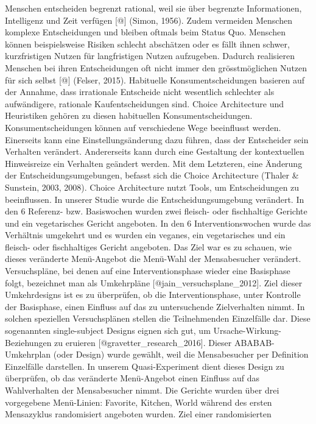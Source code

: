 \documentclass[12pt,ngerman,]{article}
\begin{document}
Menschen entscheiden begrenzt rational, weil sie über begrenzte
Informationen, Intelligenz und Zeit verfügen {[}@{]} (Simon, 1956).
Zudem vermeiden Menschen komplexe Entscheidungen und bleiben oftmals
beim Status Quo. Menschen können beispielsweise Risiken schlecht
abschätzen oder es fällt ihnen schwer, kurzfristigen Nutzen für
langfristigen Nutzen aufzugeben. Dadurch realisieren Menschen bei ihren
Entscheidungen oft nicht immer den grösstmöglichen Nutzen für sich
selbst {[}@{]} (Felser, 2015). Habituelle Konsumentscheidungen basieren
auf der Annahme, dass irrationale Entscheide nicht wesentlich schlechter
als aufwändigere, rationale Kaufentscheidungen sind. Choice Architecture
und Heuristiken gehören zu diesen habituellen Konsumentscheidungen.
Konsumentscheidungen können auf verschiedene Wege beeinflusst werden.
Einerseits kann eine Einstellungsänderung dazu führen, dass der
Entscheider sein Verhalten verändert. Andererseits kann durch eine
Gestaltung der kontextuellen Hinweisreize ein Verhalten geändert werden.
Mit dem Letzteren, eine Änderung der Entscheidungsumgebungen, befasst
sich die Choice Architecture (Thaler \& Sunstein, 2003, 2008). Choice
Architecture nutzt Tools, um Entscheidungen zu beeinflussen. In unserer
Studie wurde die Entscheidungsumgebung verändert. In den 6 Referenz-
bzw. Basiswochen wurden zwei fleisch- oder fischhaltige Gerichte und ein
vegetarisches Gericht angeboten. In den 6 Interventionswochen wurde das
Verhältnis umgekehrt und es wurden ein veganes, ein vegetarisches und
ein fleisch- oder fischhaltiges Gericht angeboten. Das Ziel war es zu
schauen, wie dieses veränderte Menü-Angebot die Menü-Wahl der
Mensabesucher verändert. Versuchspläne, bei denen auf eine
Interventionsphase wieder eine Basisphase folgt, bezeichnet man als
Umkehrpläne {[}@jain\_versuchsplane\_2012{]}. Ziel dieser Umkehrdesigns
ist es zu überprüfen, ob die Interventionsphase, unter Kontrolle der
Basisphase, einen Einfluss auf das zu untersuchende Zielverhalten nimmt.
In solchen speziellen Versuchsplänen stellen die Teilnehmenden
Einzelfälle dar. Diese sogenannten single-subject Designs eignen sich
gut, um Ursache-Wirkung-Beziehungen zu eruieren
{[}@gravetter\_research\_2016{]}. Dieser ABABAB-Umkehrplan (oder Design)
wurde gewählt, weil die Mensabesucher per Definition Einzelfälle
darstellen. In unserem Quasi-Experiment dient dieses Design zu
überprüfen, ob das veränderte Menü-Angebot einen Einfluss auf das
Wahlverhalten der Mensabesucher nimmt. Die Gerichte wurden über drei
vorgegebene Menü-Linien: Favorite, Kitchen, World während des ersten
Mensazyklus randomisiert angeboten wurden. Ziel einer randomisierten
\end{document}

